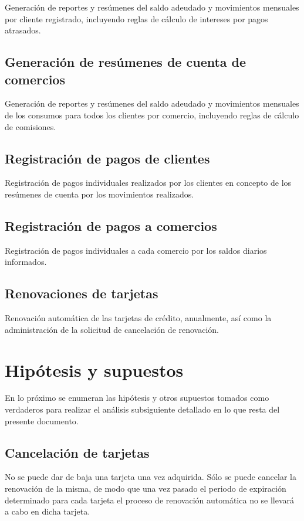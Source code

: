 Generación de reportes y resúmenes del saldo adeudado y movimientos mensuales
por cliente registrado, incluyendo reglas de cálculo de intereses por pagos
atrasados.

\subsection{Generación de resúmenes de cuenta de comercios}

Generación de reportes y resúmenes del saldo adeudado y movimientos mensuales de
los consumos para todos los clientes por comercio, incluyendo reglas de cálculo
de comisiones.

\subsection{Registración de pagos de clientes}

Registración de pagos individuales realizados por los clientes en concepto de
los resúmenes de cuenta por los movimientos realizados.

\subsection{Registración de pagos a comercios}

Registración de pagos individuales a cada comercio por los saldos diarios
informados.

\subsection{Renovaciones de tarjetas}

Renovación automática de las tarjetas de crédito, anualmente, así como la
administración de la solicitud de cancelación de renovación.


\section{Hipótesis y supuestos}

En lo próximo se enumeran las hipótesis y otros supuestos tomados como
verdaderos para realizar el análisis subsiguiente detallado en lo que resta del
presente documento.

\subsection{Cancelación de tarjetas}

No se puede dar de baja una tarjeta una vez adquirida. Sólo se puede cancelar la
renovación de la misma, de modo que una vez pasado el periodo de expiración
determinado para cada tarjeta el proceso de renovación automática no se llevará
a cabo en dicha tarjeta.

